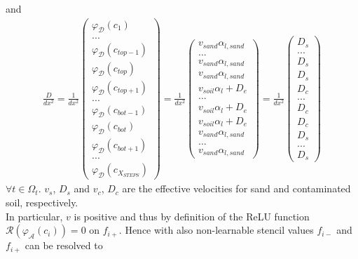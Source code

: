 and
\begin{align}
    \frac{D}{dx^2} = \frac{1}{dx^2}\left(\begin{matrix} \varphi_{\mathcal{D}}(c_1)\\ ...\\\varphi_{\mathcal{D}}(c_{top-1})\\\varphi_{\mathcal{D}}(c_{top})\\\varphi_{\mathcal{D}}(c_{top+1})\\...\\\varphi_{\mathcal{D}}(c_{bot-1})\\\varphi_{\mathcal{D}}(c_{bot})\\\varphi_{\mathcal{D}}(c_{bot+1})\\
    ...\\ \varphi_{\mathcal{D}}(c_{X_{STEPS}}) \end{matrix}\right) = \frac{1}{dx^2} \left(\begin{matrix}  v_{sand}\alpha_{l,sand}\\ ...\\v_{sand}\alpha_{l,sand}\\v_{sand}\alpha_{l,sand}\\v_{soil}\alpha_{l}+D_e\\...\\v_{soil}\alpha_{l}+D_e\\v_{soil}\alpha_{l}+D_e\\v_{sand}\alpha_{l,sand}\\
    ...\\ v_{sand}\alpha_{l,sand} \end{matrix}\right) = \frac{1}{dx^2}\left(\begin{matrix}  D_s\\ ...\\D_s\\D_s\\D_c\\...\\D_c\\D_c\\D_s\\
    ...\\D_s\end{matrix}\right)
\end{align}
$\forall t \in \Omega_t$. $v_s$, $D_s$ and $v_c$, $D_c$ are the effective velocities for sand and contaminated soil, respectively.\\
In particular, $v$ is positive and thus by definition of the ReLU function $\mathcal{R}(\varphi_{\mathcal{A}}(c_i)) = 0$ on $f_{i+}$. Hence with also non-learnable stencil values $f_{i-}$ and $f_{i+}$ can be resolved to
